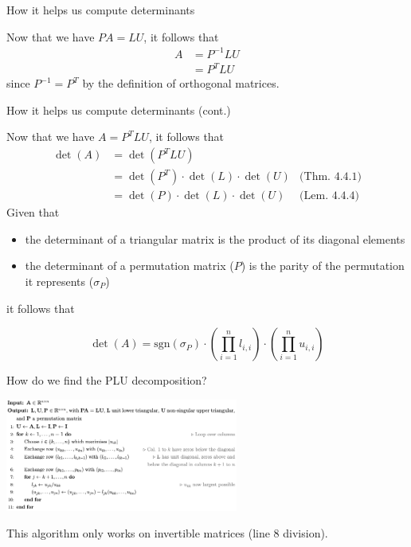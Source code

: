 \documentclass{beamer}
\begin{document}
\begin{frame}{How it helps us compute determinants}

    Now that we have $PA = LU$, it follows that
    \begin{align*}
        A &= P^{-1}LU \\
          &= P^T LU
    \end{align*}
    since $P^{-1} = P^T$ by the definition of orthogonal matrices.

\end{frame}

\begin{frame}{How it helps us compute determinants (cont.)}

    Now that we have $A=P^T LU$, it follows that
    \begin{align*}
        \det(A)  & = \det(P^T L U) & \\
                 & = \det(P^T)\cdot \det(L)\cdot \det(U) & \text{(Thm. 4.4.1)} \\
                 & = \det(P)\cdot \det(L)\cdot \det(U)   & \text{(Lem. 4.4.4)}
    \end{align*}
    Given that
    \begin{itemize}
        \item the determinant of a triangular matrix is the product of its diagonal elements
        \item the determinant of a permutation matrix ($P$) is the parity of the permutation
            it represents ($\sigma_P$)
    \end{itemize}
    it follows that
    \begin{block}{}
        \[
            \det(A) = \text{sgn}(\sigma_P) \cdot \left( \prod_{i=1}^{n} l_{i,i} \right) \cdot
            \left( \prod_{i=1}^{n} u_{i,i} \right)
        \]
    \end{block}

\end{frame}

\begin{frame}{How do we find the PLU decomposition?}

    \begin{center}{}
        \includegraphics[height=140]{PLUcode.png}
    \end{center}

    \begin{alertblock}{}
        This algorithm only works on invertible matrices (line 8 division).
    \end{alertblock}

\end{frame}
\end{document}
